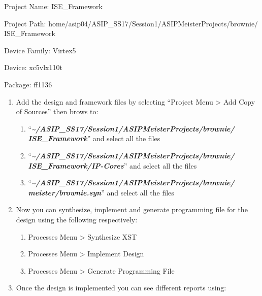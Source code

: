 \documentclass[
]{article}
\begin{document}
Project Name: ISE\_Framework

Project Path:
home/asip04/ASIP\_SS17/Session1/ASIPMeisterProjects/brownie/
ISE\_Framework

Device Family: Virtex5

Device: xc5vlx110t

Package: ff1136

\begin{enumerate}
\def\labelenumi{\arabic{enumi}.}
\setcounter{enumi}{11}
\item
  Add the design and framework files by selecting ``Project Menu
  \textgreater{} Add Copy of Sources'' then brows to:

  \begin{enumerate}
  \def\labelenumii{\alph{enumii}.}
  \item
    ``\emph{\textbf{\textasciitilde/ASIP\_SS17/Session1/ASIPMeisterProjects/brownie/
    ISE\_Framework}}'' and select all the files
  \item
    ``\emph{\textbf{\textasciitilde/ASIP\_SS17/Session1/ASIPMeisterProjects/brownie/
    ISE\_Framework/IP-Cores}}'' and select all the files
  \item
    ``\emph{\textbf{\textasciitilde/ASIP\_SS17/Session1/ASIPMeisterProjects/brownie/
    meister/brownie.syn}}'' and select all the files
  \end{enumerate}
\item
  Now you can synthesize, implement and generate programming file for
  the design using the following respectively:

  \begin{enumerate}
  \def\labelenumii{\alph{enumii}.}
  \item
    Processes Menu \textgreater{} Synthesize XST
  \item
    Processes Menu \textgreater{} Implement Design
  \item
    Processes Menu \textgreater{} Generate Programming File
  \end{enumerate}
\item
  Once the design is implemented you can see different reports using:


\end{enumerate}
\end{document}
